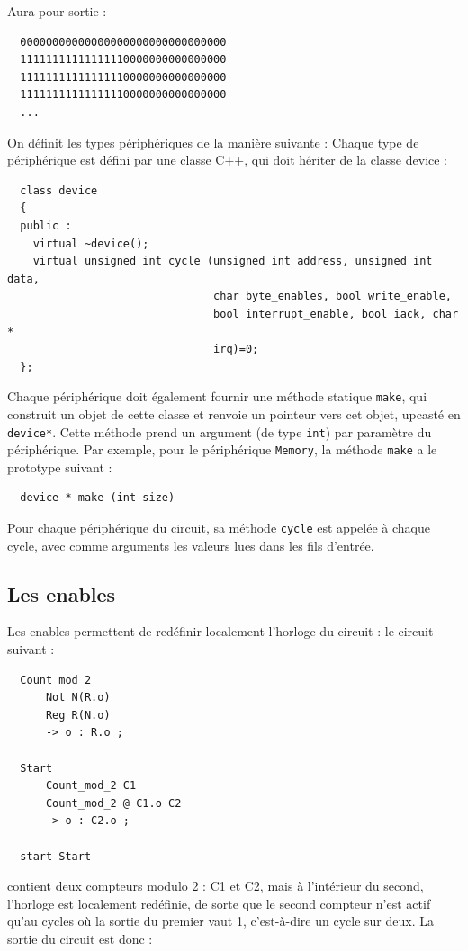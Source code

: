 \documentclass[13pt]{article}
\begin{document}
Aura pour sortie :

\begin{verbatim}
  00000000000000000000000000000000
  11111111111111110000000000000000
  11111111111111110000000000000000
  11111111111111110000000000000000
  ...
\end{verbatim}

On définit les types périphériques de la manière suivante :
Chaque type de périphérique est défini par une classe C++, qui doit
hériter de la classe device :
\begin{verbatim}
  class device
  {
  public :
    virtual ~device();
    virtual unsigned int cycle (unsigned int address, unsigned int data,
                                char byte_enables, bool write_enable,
                                bool interrupt_enable, bool iack, char *
                                irq)=0;
  };
\end{verbatim}
Chaque périphérique doit également fournir une méthode statique \texttt{make}, qui
construit un objet de cette classe et renvoie un pointeur vers cet objet,
upcasté en \texttt{device*}. Cette méthode prend un argument (de type \texttt{int}) par
paramètre du périphérique. Par exemple, pour le périphérique \texttt{Memory}, la
méthode \texttt{make} a le prototype suivant :

\begin{verbatim}
  device * make (int size)
\end{verbatim}

Pour chaque périphérique du circuit, sa méthode \texttt{cycle} est appelée à
chaque cycle, avec comme arguments les valeurs lues dans les fils d'entrée.


\subsection{Les enables}

Les enables permettent de redéfinir localement l'horloge du circuit :
le circuit suivant :
\begin{verbatim}
  Count_mod_2
      Not N(R.o)
      Reg R(N.o)
      -> o : R.o ;

  Start
      Count_mod_2 C1
      Count_mod_2 @ C1.o C2
      -> o : C2.o ;

  start Start
\end{verbatim}

contient deux compteurs modulo 2 : C1 et C2, mais à l'intérieur du second,
l'horloge est localement redéfinie, de sorte que le second compteur n'est
actif qu'au cycles où la sortie du premier vaut 1, c'est-à-dire un cycle
sur deux. La sortie du circuit est donc :
\end{document}
